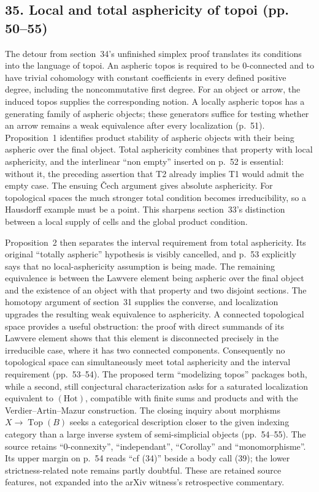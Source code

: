 \subsection*{35. Local and total asphericity of topoi (pp. 50--55)}
The detour from section~34's unfinished simplex proof translates its conditions into the language of topoi. An aspheric topos is required to be $0$-connected and to have trivial cohomology with constant coefficients in every defined positive degree, including the noncommutative first degree. For an object or arrow, the induced topos supplies the corresponding notion. A locally aspheric topos has a generating family of aspheric objects; these generators suffice for testing whether an arrow remains a weak equivalence after every localization (p.~51). Proposition~1 identifies product stability of aspheric objects with their being aspheric over the final object. Total asphericity combines that property with local asphericity, and the interlinear ``non empty'' inserted on p.~52 is essential: without it, the preceding assertion that T2 already implies T1 would admit the empty case. The ensuing \v{C}ech argument gives absolute asphericity. For topological spaces the much stronger total condition becomes irreducibility, so a Hausdorff example must be a point. This sharpens section~33's distinction between a local supply of cells and the global product condition.

Proposition~2 then separates the interval requirement from total asphericity. Its original ``totally aspheric'' hypothesis is visibly cancelled, and p.~53 explicitly says that no local-asphericity assumption is being made. The remaining equivalence is between the Lawvere element being aspheric over the final object and the existence of an object with that property and two disjoint sections. The homotopy argument of section~31 supplies the converse, and localization upgrades the resulting weak equivalence to asphericity. A connected topological space provides a useful obstruction: the proof with direct summands of its Lawvere element shows that this element is disconnected precisely in the irreducible case, where it has two connected components. Consequently no topological space can simultaneously meet total asphericity and the interval requirement (pp.~53--54). The proposed term ``modelizing topos'' packages both, while a second, still conjectural characterization asks for a saturated localization equivalent to $(\mathrm{Hot})$, compatible with finite sums and products and with the Verdier--Artin--Mazur construction. The closing inquiry about morphisms $X\to\operatorname{Top}(B)$ seeks a categorical description closer to the given indexing category than a large inverse system of semi-simplicial objects (pp.~54--55). The source retains ``0-connexity'', ``independant'', ``Corollay'' and ``monomorphisme''. Its upper margin on p.~54 reads ``cf (34)'' beside a body call (39); the lower strictness-related note remains partly doubtful. These are retained source features, not expanded into the arXiv witness's retrospective commentary.

